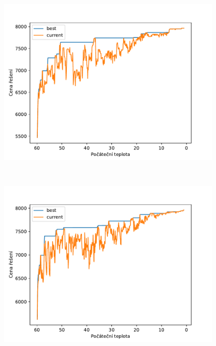 \documentclass[11pt]{article}
\begin{document}
\begin{figure}
\begin{minipage}[c]{0.32\textwidth}
    \end{minipage}
    \begin{minipage}[c]{0.32\textwidth}
        \centering \includegraphics[width=\textwidth]{img/C120.pdf} 
    \end{minipage}
    \\
    \begin{minipage}[c]{0.32\textwidth}
        \centering\includegraphics[width=\textwidth]{img/C180.pdf} 
    \end{minipage}
    \begin{minipage}[c]{0.32\textwidth}

\end{minipage}
\end{figure}
\end{document}
